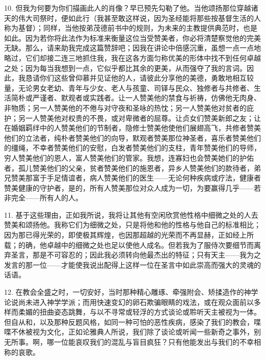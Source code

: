 10. 但我为何要为你们描画此人的肖像？早已预先勾勒了他。当他颂扬那位穿越诸天的伟大司祭时，便如此行（我甚至敢这样说，因为圣经能将那些按基督生活的人称为基督）；同样，当他按弟茂德前书中的规则，为未来的主教提供典范时，也是如此。因为若你将此法作为标准来衡量这位当受赞美者，你必将清楚察觉他的完美无缺。那么，请来助我完成这篇赞辞吧；因我在讲论中倍感沉重，虽想一点一点地略过，它们却接二连三地抓住我，我在这各方面匀称优美的形体中找不到任何卓越之处；因为每当我想到一点，它似乎都比其余的更美，从而强夺了我的言词。因此，我恳请你们这些曾仰慕并见证他的人，请彼此分享他的美德，勇敢地相互较量，无论男女老幼、青年与少女、老人与孩童、司铎与民众、独修者与共修者、生活简朴或严谨者、默观者或实践者。让一人赞美他的禁食与祈祷，仿佛他无肉身、非物质；另一人赞美他的不倦与对守夜和圣咏的热忱；另一人赞美他对贫者的庇护；另一人赞美他对权贵的不畏，或对卑微者的屈尊。让贞女们赞美新郎之友；让在婚姻羁绊中的人赞美他们的节制者，隐修士赞美他使他们展翅高飞，共修者赞美他们的立法者，纯朴者赞美他们的向导，默观者赞美那位神圣者，喜乐者赞美他们的缰绳，不幸者赞美他们的安慰，白发者赞美他们的支柱，青年赞美他们的导师，穷人赞美他们的恩人，富人赞美他们的管家。我想，连寡妇也会赞美她们的护佑者，孤儿赞美他们的父亲，贫者赞美他们的施恩者，异乡人赞美他们的款待者，弟兄赞美那富于手足情谊者，病人赞美他们的医生——无论何种疾病或疗法，健康者赞美健康的守护者，是的，所有人赞美那位对众人成为一切，为要赢得几乎——若非完全——所有人的人。\par

11. 基于这些理由，正如我所说，我将让其他有空闲欣赏他性格中细微之处的人去赞美和颂扬他。我称它们为细微之处，只是将他和他的性格与他自己的标准相比；因为那已得光荣的，即使极其辉煌，也因那超越的光荣而不再显赫，正如经上所载；的确，他卓越中的细微之处也足以使他人成名。但若我为了服侍次要细节而离弃圣言，那是不可容忍的；因此我必须转向他最杰出的特征；只有天主——我为之发言的那一位——才能使我说出配得上这样一位在圣言中如此崇高而强大的灵魂的话语。\par

12. 在教会全盛之时，一切安好，当时那种精心雕琢、牵强附会、矫揉造作的神学论说尚未进入神学学派；而用快速变幻的卵石欺骗眼睛的戏法，或在观众面前以多样而柔媚的扭曲姿态跳舞，与以不寻常或轻浮的方式谈论或聆听天主被视为一体。但自从和，以及那种反题风格，如同一种可怕的恶性疾病，感染了我们的教会，喋喋不休被视为文化，正如论雅典人所说，我们除了谈论或听闻一些新奇之事外，别无所事。啊，哪一位能哀叹我们的混乱与盲目疯狂？只有他能发出与我们的不幸相称的哀歌。\par

